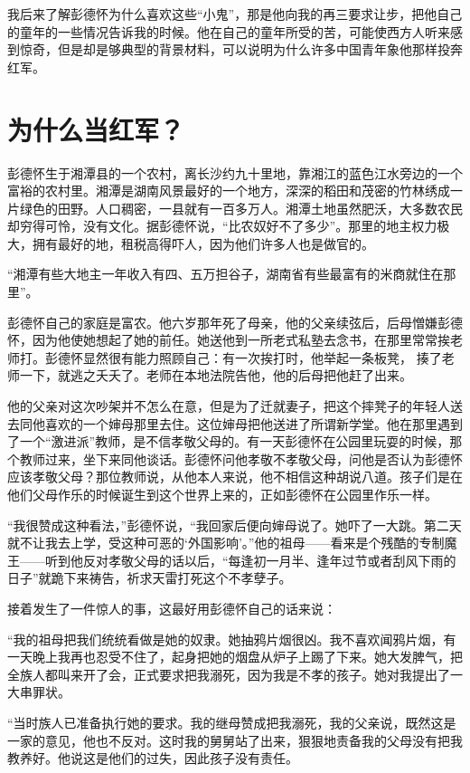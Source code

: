 \documentclass[10pt]{book}
\begin{document}
我后来了解彭德怀为什么喜欢这些“小鬼”，那是他向我的再三要求让步，把他自己的童年的一些情况告诉我的时候。他在自己的童年所受的苦，可能使西方人听来感到惊奇，但是却是够典型的背景材料，可以说明为什么许多中国青年象他那样投奔红军。

\section{为什么当红军？}

彭德怀生于湘潭县的一个农村，离长沙约九十里地，靠湘江的蓝色江水旁边的一个富裕的农村里。湘潭是湖南风景最好的一个地方，深深的稻田和茂密的竹林绣成一片绿色的田野。人口稠密，一县就有一百多万人。湘潭土地虽然肥沃，大多数农民却穷得可怜，没有文化。据彭德怀说，“比农奴好不了多少”。那里的地主权力极大，拥有最好的地，租税高得吓人，因为他们许多人也是做官的。

“湘潭有些大地主一年收入有四、五万担谷子，湖南省有些最富有的米商就住在那里”。

彭德怀自己的家庭是富农。他六岁那年死了母亲，他的父亲续弦后，后母憎嫌彭德怀，因为他使她想起了她的前任。她送他到一所老式私塾去念书，在那里常常挨老师打。彭德怀显然很有能力照顾自己：有一次挨打时，他举起一条板凳， 揍了老师一下，就逃之夭夭了。老师在本地法院告他，他的后母把他赶了出来。

他的父亲对这次吵架并不怎么在意，但是为了迁就妻子，把这个摔凳子的年轻人送去同他喜欢的一个婶母那里去住。这位婶母把他送进了所谓新学堂。他在那里遇到了一个“激进派”教师，是不信孝敬父母的。有一天彭德怀在公园里玩耍的时候，那个教师过来，坐下来同他谈话。彭德怀问他孝敬不孝敬父母，问他是否认为彭德怀应该孝敬父母？那位教师说，从他本人来说，他不相信这种胡说八道。孩子们是在他们父母作乐的时候诞生到这个世界上来的，正如彭德怀在公园里作乐一样。

“我很赞成这种看法，”彭德怀说，“我回家后便向婶母说了。她吓了一大跳。第二天就不让我去上学，受这种可恶的‘外国影响’。”他的祖母——看来是个残酷的专制魔王——听到他反对孝敬父母的话以后，“每逢初一月半、逢年过节或者刮风下雨的日子”就跪下来祷告，祈求天雷打死这个不孝孽子。

接着发生了一件惊人的事，这最好用彭德怀自己的话来说：

“我的祖母把我们统统看做是她的奴隶。她抽鸦片烟很凶。我不喜欢闻鸦片烟，有一天晚上我再也忍受不住了，起身把她的烟盘从炉子上踢了下来。她大发脾气，把全族人都叫来开了会，正式要求把我溺死，因为我是不孝的孩子。她对我提出了一大串罪状。

“当时族人已准备执行她的要求。我的继母赞成把我溺死，我的父亲说，既然这是一家的意见，他也不反对。这时我的舅舅站了出来，狠狠地责备我的父母没有把我教养好。他说这是他们的过失，因此孩子没有责任。
\end{document}

